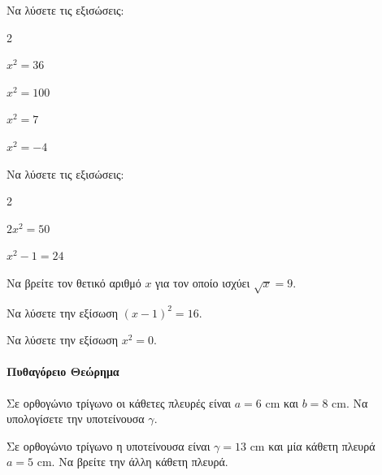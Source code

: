 \documentclass[11pt,a4paper,modern]{FFExercises}
\begin{document}
\askhsh Να λύσετε τις εξισώσεις:
\begin{multicols}{2}
\begin{alist}
    \item $x^2 = 36$
    \item $x^2 = 100$
    \item $x^2 = 7$
    \item $x^2 = -4$
\end{alist}
\end{multicols}

\askhsh Να λύσετε τις εξισώσεις:
\begin{multicols}{2}
\begin{alist}
    \item $2x^2 = 50$
    \item $x^2 - 1 = 24$
\end{alist}
\end{multicols}

\askhsh Να βρείτε τον θετικό αριθμό $x$ για τον οποίο ισχύει $\sqrt{x} = 9$.

\askhsh Να λύσετε την εξίσωση $(x-1)^2 = 16$.

\askhsh Να λύσετε την εξίσωση $x^2 = 0$.

\paragraph{Πυθαγόρειο Θεώρημα}

\askhsh Σε ορθογώνιο τρίγωνο οι κάθετες πλευρές είναι $a = 6 \text{ cm}$ και $b = 8 \text{ cm}$. Να υπολογίσετε την υποτείνουσα $\gamma$.
\begin{center}
\end{center}

\askhsh Σε ορθογώνιο τρίγωνο η υποτείνουσα είναι $\gamma = 13 \text{ cm}$ και μία κάθετη πλευρά $a = 5 \text{ cm}$. Να βρείτε την άλλη κάθετη πλευρά.
\begin{center}
\end{center}
\end{document}
